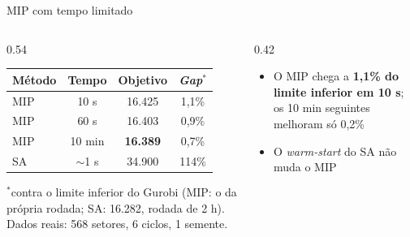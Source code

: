 \documentclass[aspectratio=169,11pt]{beamer}
\begin{document}
\begin{frame}{MIP com tempo limitado}
  \small
  \begin{columns}[T]
    \begin{column}{0.54\textwidth}
      \centering
      \footnotesize
      \begin{tabular}{lccc}
        \toprule
        Método & Tempo & Objetivo & \textit{Gap}$^{*}$ \\
        \midrule
        MIP & 10 s   & 16.425 & 1,1\% \\
        MIP & 60 s   & 16.403 & 0,9\% \\
        MIP & 10 min & \textbf{16.389} & 0,7\% \\
        \midrule
        SA & $\sim$1 s & 34.900 & 114\% \\
        \bottomrule
      \end{tabular}

      {\scriptsize $^{*}$contra o limite inferior do Gurobi (MIP: o da própria rodada; SA: 16.282, rodada de 2 h). Dados reais: 568 setores, 6 ciclos, 1 semente.\par}
    \end{column}
    \begin{column}{0.42\textwidth}
      \begin{itemize}
        \item O MIP chega a \textbf{1,1\% do limite inferior em 10 s}; os 10 min seguintes melhoram só 0,2\%
        \item O \textit{warm-start} do SA não muda o MIP
      \end{itemize}
    \end{column}
  \end{columns}
\end{frame}
\end{document}
